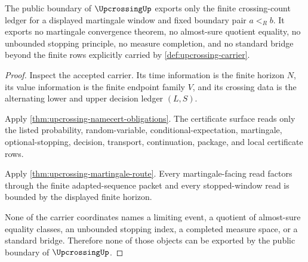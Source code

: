 \begin{theorem}
\label{thm:upcrossing-nonescape}
The public boundary of $\UpcrossingUp$ exports only the finite crossing-count ledger for a displayed martingale window and fixed boundary pair $a<_R b$. It exports no martingale convergence theorem, no almost-sure quotient equality, no unbounded stopping principle, no measure completion, and no standard bridge beyond the finite rows explicitly carried by \autoref{def:upcrossing-carrier}.
\end{theorem}
\begin{proof}
Inspect the accepted carrier. Its time information is the finite horizon $N$, its value information is the finite endpoint family $V$, and its crossing data is the alternating lower and upper decision ledger $(L,S)$.

Apply \autoref{thm:upcrossing-namecert-obligations}. The certificate surface reads only the listed probability, random-variable, conditional-expectation, martingale, optional-stopping, decision, transport, continuation, package, and local certificate rows.

Apply \autoref{thm:upcrossing-martingale-route}. Every martingale-facing read factors through the finite adapted-sequence packet and every stopped-window read is bounded by the displayed finite horizon.

None of the carrier coordinates names a limiting event, a quotient of almost-sure equality classes, an unbounded stopping index, a completed measure space, or a standard bridge. Therefore none of those objects can be exported by the public boundary of $\UpcrossingUp$.
\end{proof}


\begin{closurestatus}{\UpcrossingUp}
  \theoryclosure{\matureClosure}
  \formalstatus{\unformalizedV}
\end{closurestatus}
